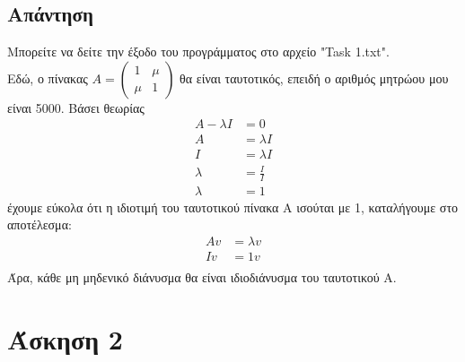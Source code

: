 \documentclass[a4paper,12pt]{article}
\begin{document}
\subsection{Απάντηση}
Μπορείτε να δείτε την έξοδο του προγράμματος στο αρχείο "Task 1.txt".\\
Εδώ, ο πίνακας $
	A=\begin{pmatrix}
		1   & \mu \\
		\mu & 1
	\end{pmatrix}
$ θα είναι ταυτοτικός, επειδή ο αριθμός μητρώου μου είναι 5000. Βάσει θεωρίας
\begin{equation}
	\begin{split}
		A - \lambda I &= 0 \\
		A &= \lambda I \\
		I &= \lambda I \\
		\lambda & =\frac{I}{I} \\
		\lambda & =1
	\end{split}
\end{equation}
έχουμε εύκολα ότι η ιδιοτιμή του ταυτοτικού  πίνακα Α ισούται με 1,
καταλήγουμε στο αποτέλεσμα:
\begin{equation}
	\begin{split}
		A v &= \lambda v \\
		I v&= 1 v \\
	\end{split}
\end{equation}
Άρα, κάθε μη μηδενικό διάνυσμα θα είναι ιδιοδιάνυσμα του ταυτοτικού Α.
\newpage\section{Άσκηση 2}
\end{document}
